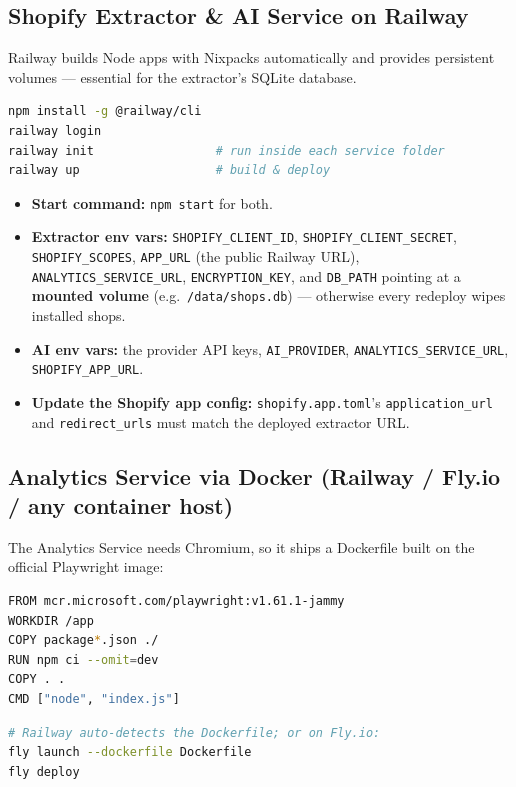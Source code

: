 \documentclass[11pt,a4paper]{article}
\begin{document}
\subsection{Shopify Extractor \& AI Service on Railway}

Railway builds Node apps with Nixpacks automatically and provides persistent
volumes --- essential for the extractor's SQLite database.

\begin{lstlisting}[language=bash]
npm install -g @railway/cli
railway login
railway init                 # run inside each service folder
railway up                   # build & deploy
\end{lstlisting}

\begin{itemize}[leftmargin=1.4em]
  \item \textbf{Start command:} \texttt{npm start} for both.
  \item \textbf{Extractor env vars:} \texttt{SHOPIFY\_CLIENT\_ID},
  \texttt{SHOPIFY\_CLIENT\_SECRET}, \texttt{SHOPIFY\_SCOPES}, \texttt{APP\_URL}
  (the public Railway URL), \texttt{ANALYTICS\_SERVICE\_URL},
  \texttt{ENCRYPTION\_KEY}, and \texttt{DB\_PATH} pointing at a
  \textbf{mounted volume} (e.g.\ \texttt{/data/shops.db}) --- otherwise every
  redeploy wipes installed shops.
  \item \textbf{AI env vars:} the provider API keys, \texttt{AI\_PROVIDER},
  \texttt{ANALYTICS\_SERVICE\_URL}, \texttt{SHOPIFY\_APP\_URL}.
  \item \textbf{Update the Shopify app config:} \texttt{shopify.app.toml}'s
  \texttt{application\_url} and \texttt{redirect\_urls} must match the deployed
  extractor URL.
\end{itemize}

\subsection{Analytics Service via Docker (Railway / Fly.io / any container host)}

The Analytics Service needs Chromium, so it ships a Dockerfile built on the
official Playwright image:

\begin{lstlisting}[language=bash]
FROM mcr.microsoft.com/playwright:v1.61.1-jammy
WORKDIR /app
COPY package*.json ./
RUN npm ci --omit=dev
COPY . .
CMD ["node", "index.js"]
\end{lstlisting}

\begin{lstlisting}[language=bash]
# Railway auto-detects the Dockerfile; or on Fly.io:
fly launch --dockerfile Dockerfile
fly deploy
\end{lstlisting}
\end{document}
